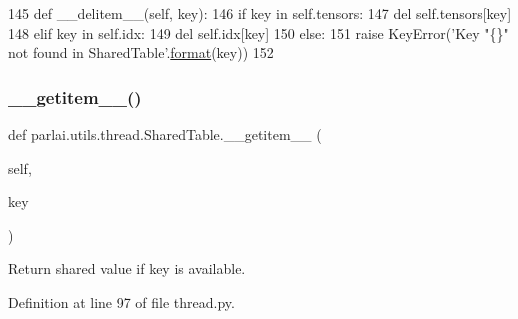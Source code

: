 \begin{DoxyCode}
145     \textcolor{keyword}{def }\_\_delitem\_\_(self, key):
146         \textcolor{keywordflow}{if} key \textcolor{keywordflow}{in} self.tensors:
147             del self.tensors[key]
148         \textcolor{keywordflow}{elif} key \textcolor{keywordflow}{in} self.idx:
149             del self.idx[key]
150         \textcolor{keywordflow}{else}:
151             \textcolor{keywordflow}{raise} KeyError(\textcolor{stringliteral}{'Key "\{\}" not found in SharedTable'}.\hyperlink{namespaceparlai_1_1chat__service_1_1services_1_1messenger_1_1shared__utils_a32e2e2022b824fbaf80c747160b52a76}{format}(key))
152 
\end{DoxyCode}
\mbox{\label{classparlai_1_1utils_1_1thread_1_1SharedTable_a624b898ff3294a8be69ad796640cc7ee}} 
\subsubsection{\texorpdfstring{\+\_\+\+\_\+getitem\+\_\+\+\_\+()}{\_\_getitem\_\_()}}
{\footnotesize\ttfamily def parlai.\+utils.\+thread.\+Shared\+Table.\+\_\+\+\_\+getitem\+\_\+\+\_\+ (\begin{DoxyParamCaption}\item[{}]{self,  }\item[{}]{key }\end{DoxyParamCaption})}

\begin{DoxyVerb}Return shared value if key is available.
\end{DoxyVerb}
 

Definition at line 97 of file thread.\+py.


